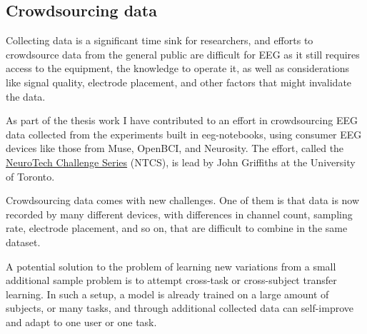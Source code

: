 \subsection{Crowdsourcing data}

    Collecting data is a significant time sink for researchers, and efforts to crowdsource data from the general public are difficult for EEG as it still requires access to the equipment, the knowledge to operate it, as well as considerations like signal quality, electrode placement, and other factors that might invalidate the data.

    As part of the thesis work I have contributed to an effort in crowdsourcing EEG data collected from the experiments built in eeg-notebooks, using consumer EEG devices like those from Muse, OpenBCI, and Neurosity\@. The effort, called the \href{https://neurotech-challenge.com/}{NeuroTech Challenge Series} (NTCS), is lead by John Griffiths at the University of Toronto.

    Crowdsourcing data comes with new challenges. One of them is that data is now recorded by many different devices, with differences in channel count, sampling rate, electrode placement, and so on, that are difficult to combine in the same dataset. 

    A potential solution to the problem of learning new variations from a small additional sample problem is to attempt cross-task or cross-subject transfer learning. In such a setup, a model is already trained on a large amount of subjects, or many tasks, and through additional collected data can self-improve and adapt to one user or one task.


